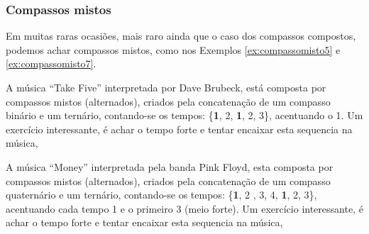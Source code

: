 \subsubsection{Compassos mistos}
Em muitas raras ocasiões, mais raro ainda que o caso dos compassos compostos, 
podemos achar compassos mistos, como nos Exemplos \ref{ex:compassomisto5} e \ref{ex:compassomisto7}.

\begin{example}
\label{ex:compassomisto5}
A música ``Take Five'' interpretada por  Dave Brubeck,
está composta por compassos mistos (alternados), criados pela concatenação de um compasso binário e um ternário,
contando-se os tempos: \{\textbf{1}, 2, \textbf{1}, 2, 3\}, acentuando o 1.
Um exercício interessante, é achar o tempo forte  e tentar encaixar esta sequencia na música, 
\end{example}

\begin{example}
\label{ex:compassomisto7}
A música ``Money'' interpretada pela banda  Pink Floyd,
esta composta por compassos mistos (alternados), criados pela concatenação de um compasso quaternário e um ternário,
contando-se os tempos: \{\textbf{1}, 2 , 3, 4, \textbf{1}, 2, 3\}, acentuando cada tempo 1 e o primeiro 3 (meio forte).
Um exercício interessante, é achar o tempo forte  e tentar encaixar esta sequencia na música, 
\end{example}
